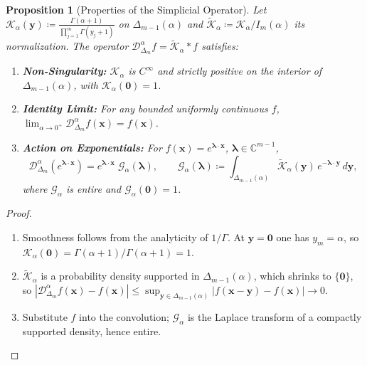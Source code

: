 \documentclass[11pt,a4paper]{article}
\theoremstyle{plain}
\newtheorem{proposition}[theorem]{Proposition}
\theoremstyle{definition}
\theoremstyle{remark}
\numberwithin{equation}{section}
\begin{document}
\begin{proposition}[Properties of the Simplicial Operator]
\label{prop:fractional_props}
Let $\mathcal{K}_\alpha(\mathbf{y}) \coloneqq \frac{\Gamma(\alpha+1)}{\prod_{j=1}^m \Gamma(y_j+1)}$ on $\Delta_{m-1}(\alpha)$ and $\widetilde{\mathcal{K}}_\alpha \coloneqq \mathcal{K}_\alpha / I_m(\alpha)$ its normalization. The operator $\mathcal{D}_{\Delta_m}^\alpha f = \widetilde{\mathcal{K}}_\alpha * f$ satisfies:
\begin{enumerate}
    \item \textbf{Non-Singularity:} $\mathcal{K}_\alpha$ is $C^\infty$ and strictly positive on the interior of $\Delta_{m-1}(\alpha)$, with $\mathcal{K}_\alpha(\mathbf{0}) = 1$.
    \item \textbf{Identity Limit:} For any bounded uniformly continuous $f$, $\lim_{\alpha \to 0^+} \mathcal{D}_{\Delta_m}^\alpha f(\mathbf{x}) = f(\mathbf{x})$.
    \item \textbf{Action on Exponentials:} For $f(\mathbf{x}) = e^{\boldsymbol{\lambda}\cdot\mathbf{x}}$, $\boldsymbol{\lambda} \in \mathbb{C}^{m-1}$,
    \begin{equation}
    \mathcal{D}_{\Delta_m}^\alpha \left(e^{\boldsymbol{\lambda}\cdot\mathbf{x}}\right) = e^{\boldsymbol{\lambda}\cdot\mathbf{x}}\; \mathcal{G}_\alpha(\boldsymbol{\lambda}), \qquad \mathcal{G}_\alpha(\boldsymbol{\lambda}) \coloneqq \int_{\Delta_{m-1}(\alpha)} \widetilde{\mathcal{K}}_\alpha(\mathbf{y})\, e^{-\boldsymbol{\lambda}\cdot\mathbf{y}}\, d\mathbf{y},
    \end{equation}
    where $\mathcal{G}_\alpha$ is entire and $\mathcal{G}_\alpha(\mathbf{0}) = 1$.
\end{enumerate}
\end{proposition}

\begin{proof}
\leavevmode
\begin{enumerate}
    \item Smoothness follows from the analyticity of $1/\Gamma$. At $\mathbf{y} = \mathbf{0}$ one has $y_m = \alpha$, so $\mathcal{K}_\alpha(\mathbf{0}) = \Gamma(\alpha+1)/\Gamma(\alpha+1) = 1$.
    \item $\widetilde{\mathcal{K}}_\alpha$ is a probability density supported in $\Delta_{m-1}(\alpha)$, which shrinks to $\{\mathbf{0}\}$, so $|\mathcal{D}_{\Delta_m}^\alpha f(\mathbf{x}) - f(\mathbf{x})| \le \sup_{\mathbf{y} \in \Delta_{m-1}(\alpha)} |f(\mathbf{x}-\mathbf{y}) - f(\mathbf{x})| \to 0$.
    \item Substitute $f$ into the convolution; $\mathcal{G}_\alpha$ is the Laplace transform of a compactly supported density, hence entire.
\end{enumerate}
\end{proof}
\end{document}
